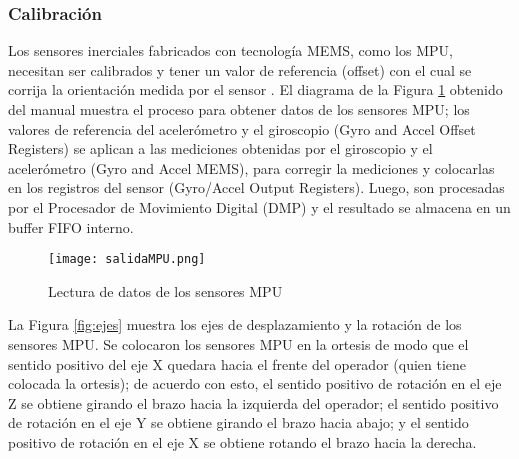 \subsubsection{Calibración}

Los sensores inerciales fabricados con tecnología MEMS, como los MPU, necesitan ser calibrados y tener un valor de referencia (offset) con el cual se corrija la orientación medida por el sensor \cite{offsetMPU}. El diagrama de la Figura \ref{fig:salidaMPU} obtenido del manual \cite{offsetMPU} muestra el proceso para obtener datos de los sensores MPU; los valores de referencia del acelerómetro y el giroscopio (Gyro and Accel Offset Registers) se aplican a las mediciones obtenidas por el giroscopio y el acelerómetro (Gyro and Accel MEMS), para corregir la mediciones y colocarlas en los registros del sensor (Gyro/Accel Output Registers). Luego, son procesadas por el Procesador de Movimiento Digital (DMP) y el resultado se almacena en un buffer FIFO interno.

\begin{figure}[htb]
	\centering
	\texttt{[image: salidaMPU.png]}
	\caption{Lectura de datos de los sensores MPU}
	\label{fig:salidaMPU}
\end{figure}



\newpage
La Figura \ref{fig:ejes} muestra los ejes de desplazamiento y la rotación de los sensores MPU. Se colocaron los sensores MPU en la ortesis de modo que el sentido positivo del eje X quedara hacia el frente del operador (quien tiene colocada la ortesis); de acuerdo con esto, el sentido positivo de rotación en el eje Z se obtiene girando el brazo hacia la izquierda del operador; el sentido positivo de rotación en el eje Y se obtiene girando el brazo hacia abajo; y el sentido positivo de rotación en el eje X se obtiene rotando el brazo hacia la derecha.

